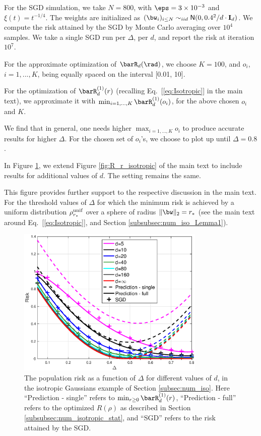 \documentclass[11pt]{article}
\begin{document}
 For the SGD simulation, we take $N=800$, with $\eps=3\times 10^{-3}$ and $\xi(t) = t^{-1/4}$. The weights are initialized as $(\bw_{i})_{i\leq N}\sim_{iid}\mathsf{N}(0,0.4^2/d\cdot \mathbf{I}_d)$. We compute the risk attained by the SGD by Monte Carlo averaging over $10^4$ samples. We take a single SGD run per $\Delta$, per $d$, and report the risk at iteration $10^7$.

For the approximate optimization of $\barR_d(\rad)$, we choose $K=100$, and $o_i$, $i=1,...,K$, being equally spaced on the interval [0.01, 10].

For the optimization of $\barR^{(1)}_d(r)$ (recalling Eq.~[\ref{eq:Isotropic}] in the main text), we approximate it with $\min_{i=1,...,K}\barR^{(1)}_d(o_i)$, for the above chosen $o_i$ and $K$.

We find that in general, one needs higher $\max_{i=1,...,K}o_i$ to produce accurate results for higher $\Delta$. For the chosen set of $o_i$'s, we choose to plot up until $\Delta=0.8$.

 In Figure \ref{fig:num_iso_risk_all}, we extend Figure \ref{fig:R_r_isotropic} of the main text to include results for additional values of $d$. The setting remains the same.

This figure provides further support to the respective discussion in the main text. For the threshold values of $\Delta$ for which the minimum risk is achieved by a uniform distribution $\rho^{\rm unif}_{r_*}$ over a sphere of radius $\Vert\bw\Vert_2=r_*$ (see the main text around Eq.~[\ref{eq:Isotropic}], and Section \ref{subsubsec:num_iso_Lemma1}).

\begin{figure}[]
	\begin{center}
		\includegraphics[width=0.8\textwidth]{isotropic_risk_plot_all.eps}
	\end{center}
	\caption{The population risk as a function of $\Delta$ for different values of $d$, in the isotropic Gaussians example of Section \ref{subsec:num_iso}. Here ``Prediction - single'' refers to $\min_{r\geq 0}\barR_d^{(1)}(r)$, ``Prediction - full'' refers to the optimized $R(\rho)$ as described in Section \ref{subsubsec:num_isotropic_stat}, and ``SGD'' refers to the risk attained by the SGD.}
	\label{fig:num_iso_risk_all}
\end{figure}
\end{document}
